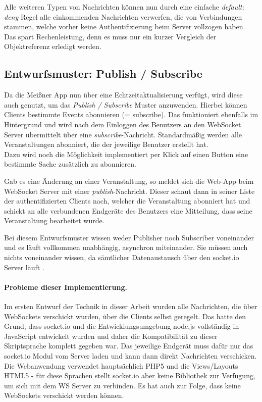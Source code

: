 Alle weiteren Typen von Nachrichten können nun durch eine einfache \emph{default: deny} Regel alle einkommenden Nachrichten verwerfen, die von Verbindungen stammen, welche vorher keine Authentifizierung beim Server vollzogen haben. Das spart Rechenleistung, denn es muss nur ein kurzer Vergleich der Objektreferenz erledigt werden.\par


\subsection{Entwurfsmuster: Publish / Subscribe}
Da die Meißner App nun über eine Echtzeitaktualisierung verfügt, wird diese auch genutzt, um das \emph{Publish / Subscribe} Muster anzuwenden. Hierbei können Clients bestimmte Events abonnieren (= subscribe). Das funktioniert ebenfalls im Hintergrund und wird nach dem Einloggen des Benutzers an den WebSocket Server übermittelt über eine \emph{subscribe}-Nachricht. Standardmäßig werden alle Veranstaltungen abonniert, die der jeweilige Benutzer erstellt hat.\\
Dazu wird noch die Möglichkeit implementiert per Klick auf einen Button eine bestimmte Sache zusätzlich zu abonnieren.\par

Gab es eine Änderung an einer Veranstaltung, so meldet sich die Web-App beim WebSocket Server mit einer \emph{publish}-Nachricht. Dieser schaut dann in seiner Liste der authentifizierten Clients nach, welcher die Veranstaltung abonniert hat und schickt an alle verbundenen Endgeräte des Benutzers eine Mitteilung, dass seine Veranstaltung bearbeitet wurde.\par

Bei diesem Entwurfsmuster wissen weder Publisher noch Subscriber voneinander und es läuft vollkommen unabhängig, asynchron miteinander. Sie müssen auch nichts voneinander wissen, da sämtlicher Datenaustausch über den socket.io Server läuft \cite{autobahn.js:pubsub}.

\paragraph{Probleme dieser Implementierung.}
Im ersten Entwurf der Technik in dieser Arbeit wurden alle Nachrichten, die über WebSockets verschickt wurden, über die Clients selbst geregelt. Das hatte den Grund, dass socket.io und die Entwicklungsumgebung node.js vollständig in JavaScript entwickelt wurden und daher die Kompatibilität zu dieser Skriptsprache komplett gegeben war. Das jeweilige Endgerät muss dafür nur das socket.io Modul vom Server laden und kann dann direkt Nachrichten verschicken.\\
Die Webanwendung verwendet hauptsächlich PHP5 und die Views/Layouts HTML5 - für diese Sprachen stellt socket.io aber keine Bibliothek zur Verfügung, um sich mit dem WS Server zu verbinden. Es hat auch zur Folge, dass keine WebSockets verschickt werden können.\par


